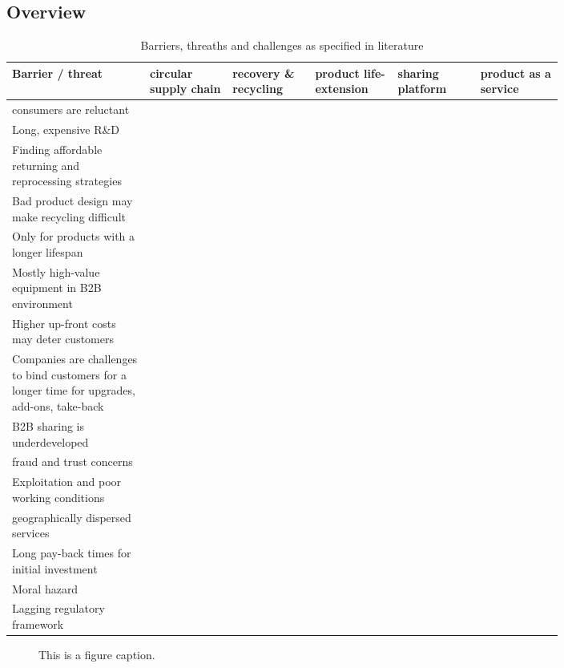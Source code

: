 \documentclass[a4paper,man,10pt]{apa6}
\begin{document}
\subsection{Overview}
\begin{table} \tiny \centering
\begin{tabular}{p{0.2\linewidth}|p{0.12\linewidth} p{0.12\linewidth} p{0.12\linewidth} p{0.12\linewidth} p{0.12 \linewidth}}
Barrier / threat & circular supply chain &recovery \& recycling& product life-extension& sharing platform& product as a service \\\hline
consumers are reluctant & \cite{Lacy2015} & & & \cite{Lacy2015}&\\
Long, expensive R\&D & \cite{Lacy2015} & & & &\\
Finding affordable returning and reprocessing strategies& & \cite{Lacy2015} & & &\\
Bad product design may make recycling difficult  & & \cite{Lacy2015} & & &\\
Only for products with a longer lifespan&& &\cite{Lacy2015}  & &\\
Mostly high-value equipment in B2B environment&& &\cite{Lacy2015}  & &\\
Higher up-front costs may deter customers&& &\cite{Lacy2015}  & &\\
Companies are challenges to bind customers for a longer time for upgrades, add-ons, take-back && &\cite{Lacy2015}  & &\\
B2B sharing is underdeveloped &&&&\cite{Lacy2015}&\\
fraud and trust concerns&&&&\cite{Lacy2015}&\\
Exploitation and poor working conditions&&&&\cite{Lacy2015}&\\
geographically dispersed services&& &&&\cite{Lacy2015}  \\
Long pay-back times for initial investment&& &&&\cite{Lacy2015}  \\
Moral hazard&& &&&\cite{Lacy2015}  \\
Lagging regulatory framework&& &&&\cite{Lacy2015}  \\
\hline
\end{tabular}\caption{Barriers, threaths and challenges as specified in literature}\label{tab:barriers}
\end{table}



%

\appendix



\begin{figure}
\centering
\caption{\label{fig:frog}This is a figure caption.}
\end{figure}
\end{document}
